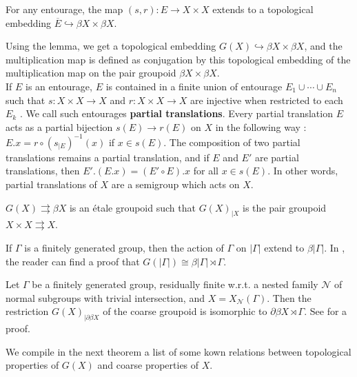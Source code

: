 \begin{lem}\cite{RoeCoarse}
For any entourage, the map $(s,r) : E\rightarrow X\times X$ extends to a topological embedding $\overline E \hookrightarrow \beta X\times \beta X$.
\end{lem}

Using the lemma, we get a topological embedding $G(X)\hookrightarrow \beta X\times \beta X$, and the multiplication map is defined as conjugation by this topological embedding of the multiplication map on the pair groupoid $\beta X\times \beta X$.\\

If $E$ is an entourage, $E$ is contained in a finite union of entourage $E_1\cup \cdots \cup E_n$ such that $s: X\times X \rightarrow X$ and $r: X\times X \rightarrow X$ are injective when restricted to each $E_k$ \cite{RoeCoarse}. We call such entourages \textbf{partial translations}. Every partial translation $E$ acts as a partial bijection $s(E)\rightarrow r(E)$ on $X$ in the following way : $E.x = r\circ (s_{|E})^{-1}(x)$ if $x\in s(E)$. The composition of two partial translations remains a partial translation, and if $E$ and $E'$ are partial translations, then $E'.(E.x) = (E'\circ E).x$ for all $x\in s(E)$. In other words, partial translations of $X$ are a semigroup which acts on $X$.

\begin{prop}\cite{SkTuYu} $G(X)\rightrightarrows \beta X$ is an étale groupoid such that $G(X)_{|X}$ is the pair groupoid $X\times X\rightrightarrows X$.  
\end{prop}

\begin{Expl} If $\Gamma$ is a finitely generated group, then the action of $\Gamma$ on $|\Gamma|$ extend to $\beta | \Gamma |$. In \cite{SkTuYu}, the reader can find a proof that $G( | \Gamma | )\cong \beta | \Gamma | \rtimes \Gamma $.
\end{Expl}

\begin{Expl} Let $\Gamma$ be a finitely generated group, residually finite w.r.t. a nested family $\mathcal N$ of normal subgroups with trivial intersection, and $X=X_{\mathcal N}(\Gamma)$. Then the restriction $G(X)_{|\partial \beta X}$ of the coarse groupoid is isomorphic to $\partial \beta X\rtimes \Gamma$. See \cite{FinnCoarse} for a proof.
\end{Expl}

We compile in the next theorem a list of some kown relations between topological properties of $G(X)$ and coarse properties of $X$.

